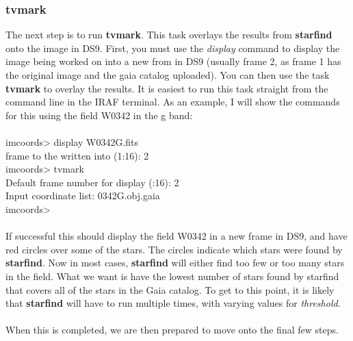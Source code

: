 \documentclass[a4paper]{article}
\begin{document}
\subsubsection{tvmark}
The next step is to run \textbf{tvmark}.  This task overlays the results from \textbf{starfind} onto the image in DS9.  First, you must use the \textit{display} command to display the image being worked on into a new from in DS9 (usually frame 2, as frame 1 has the original image and the gaia catalog uploaded).  You can then use the task \textbf{tvmark} to overlay the results.  It is easiest to run this task straight from the command line in the IRAF terminal.  As an example, I will show the commands for this using the field W0342 in the g band: \\ \\
imcoords> display W0342G.fits \\
frame to the written into (1:16): 2 \\
imcoords> tvmark \\
Default frame number for display (:16): 2 \\
Input coordinate list: 0342G.obj.gaia \\
imcoords> \\ \\
If successful this should display the field W0342 in a new frame in DS9, and have red circles over some of the stars.  The circles indicate which stars were found by \textbf{starfind}.  Now in most cases, \textbf{starfind} will either find too few or too many stars in the field.  What we want is have the lowest number of stars found by starfind that covers all of the stars in the Gaia catalog. To get to this point, it is likely that \textbf{starfind} will have to run multiple times, with varying values for \textit{threshold}. \\ \\
When this is completed, we are then prepared to move onto the final few steps.
\end{document}
